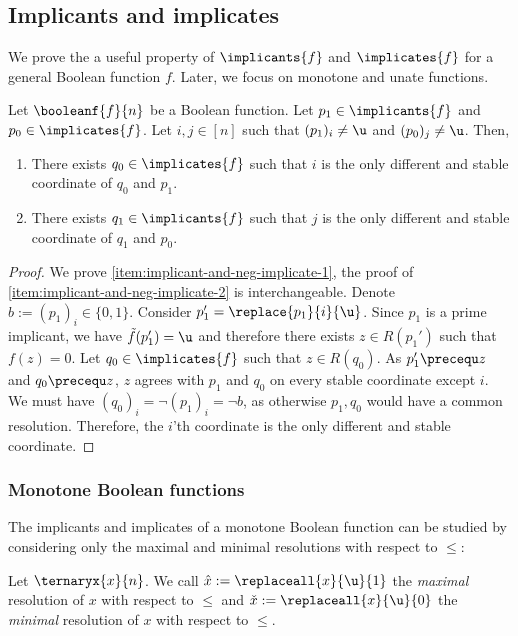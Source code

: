 \documentclass[acmsmall, nonacm, authorversion]{acmart}
\begin{document}
\subsection{Implicants and implicates}\label{sec:implicants}
We prove the a useful property of $\implicants{f}$ and $\implicates{f}$ for a general Boolean function $f$. Later, we focus on monotone and unate functions. 

\begin{proposition}\label{prop:implicant-and-neg-implicate}
Let $\booleanf{f}{n}$ be a Boolean function. Let $p_1\in\implicants{f}$ and $p_0\in \implicates{f}$. Let $i,j\in[n]$ such that $(p_1)_i\neq \u$ and $(p_0)_j\neq \u$. Then,
\begin{enumerate}
    \item There exists $q_0\in\implicates{f}$ such that $i$ is the only different and stable coordinate of $q_0$ and $p_1$.\label{item:implicant-and-neg-implicate-1}
    \item There exists $q_1\in\implicants{f}$ such that $j$ is the only different and stable coordinate of $q_1$ and $p_0$.\label{item:implicant-and-neg-implicate-2}
\end{enumerate} 
\end{proposition}
\begin{proof}
We prove \eqref{item:implicant-and-neg-implicate-1}, the proof of \eqref{item:implicant-and-neg-implicate-2} is interchangeable. Denote $b:=(p_1)_i\in \{0,1\}$. Consider $p_1'=\replace{p_1}{i}{\u}$. Since $p_1$ is a prime implicant, we have $\tilde{f}(p'_1)=\u$ and therefore there exists $z\in R(p_1')$ such that $f(z)=0$.
Let $q_0\in \implicates{f}$ such that $z\in R(q_0)$. 
As $p_1'\precequ z$ and $q_0\precequ z$, $z$ agrees with $p_1$ and $q_0$ on every stable coordinate except $i$. We must have $(q_0)_i=\neg (p_1)_i=\neg b$, as otherwise $p_1,q_0$ would have a common resolution. Therefore, the $i$'th coordinate is the only different and stable coordinate.
\end{proof}

\subsubsection{Monotone Boolean functions}\label{subsec:prime-implicants-monotone}
The implicants and implicates of a monotone Boolean function can be studied by considering only the maximal and minimal resolutions with respect to $\le$:
\begin{definition}\label{def:max-and-min-res}
Let $\ternaryx{x}{n}$. We call $\hat{x}:=\replaceall{x}{\u}{1}$ the \emph{maximal} resolution of $x$ with respect to $\le$ and $\check{x}:=\replaceall{x}{\u}{0}$ the \emph{minimal} resolution of $x$ with respect to $\le$.
\end{definition}
\end{document}
